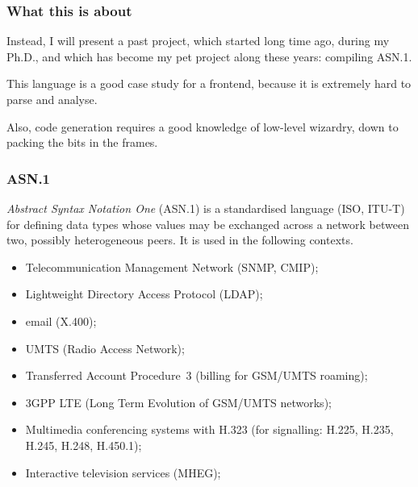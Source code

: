 \documentclass[compress,dvips,xcolor={dvipsnames},t]{beamer}
\newcommand\ASN{\textsf{ASN.1}\xspace}
\begin{document}

\begin{frame}
\frametitle{What this is about}

Instead, I will present a past project, which started long time ago,
during my Ph.D., and which has become my pet project along these
years: compiling \ASN.

\bigskip

This language is a good case study for a frontend, because it is
extremely hard to parse and analyse.

\bigskip

Also, code generation requires a good knowledge of low-level wizardry,
down to packing the bits in the frames.

\end{frame}


\begin{frame}
\frametitle{\ASN}

\emph{Abstract Syntax Notation One} (\ASN) is a standardised language
(ISO, ITU-T) for defining data types whose values may be exchanged
across a network between two, possibly heterogeneous peers. It is used
in the following contexts.

\begin{itemize}

  \item Telecommunication Management Network (SNMP, CMIP);

  \item Lightweight Directory Access Protocol (LDAP);

  \item email (\textsf{X.400});

  \item \textsf{UMTS} (Radio Access Network);

  \item Transferred Account Procedure~3 (billing for
    \textsf{GSM/UMTS} roaming);

  \item \textsf{3GPP LTE} (Long Term Evolution of \textsf{GSM/UMTS}
    networks);

  \item Multimedia conferencing systems with \textsf{H.323} (for
    signalling: \textsf{H.225}, \textsf{H.235}, \textsf{H.245},
    \textsf{H.248}, \textsf{H.450.1});

  \item Interactive television services (\textsf{MHEG});

\end{itemize}

\end{frame}
\end{document}
